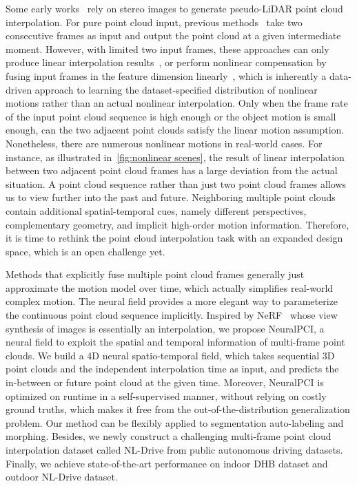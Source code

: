 \documentclass[10pt,twocolumn,letterpaper]{article}
\begin{document}
Some early works~\cite{liu2020plin, liu2021pseudo} rely on stereo images to generate pseudo-LiDAR point cloud interpolation. For pure point cloud input, previous methods~\cite{lu2021pointinet, zeng2022idea} take two consecutive frames as input and output the point cloud at a given intermediate moment. However, with limited two input frames, these approaches can only produce linear interpolation results~\cite{lu2021pointinet}, or perform nonlinear compensation by fusing input frames in the feature dimension linearly~\cite{zeng2022idea}, which is inherently a data-driven approach to learning the dataset-specified distribution of nonlinear motions rather than an actual nonlinear interpolation. Only when the frame rate of the input point cloud sequence is high enough or the object motion is small enough, can the two adjacent point clouds satisfy the linear motion assumption. Nonetheless, there are numerous nonlinear motions in real-world cases. For instance, as illustrated in~\cref{fig:nonlinear scenes}, the result of linear interpolation between two adjacent point cloud frames has a large deviation from the actual situation. A point cloud sequence rather than just two point cloud frames allows us to view further into the past and future. Neighboring multiple point clouds contain additional spatial-temporal cues, namely different perspectives, complementary geometry, and implicit high-order motion information. Therefore, it is time to rethink the point cloud interpolation task with an expanded design space, which is an open challenge yet.
 


Methods that explicitly fuse multiple point cloud frames generally just approximate the motion model over time, which actually simplifies real-world complex motion. The neural field provides a more elegant way to parameterize the continuous point cloud sequence implicitly. Inspired by NeRF~\cite{mildenhall2021nerf} whose view synthesis of images is essentially an interpolation, we propose NeuralPCI, a neural field to exploit the spatial and temporal information of multi-frame point clouds. We build a 4D neural spatio-temporal field, which takes sequential 3D point clouds and the independent interpolation time as input, and predicts the in-between or future point cloud at the given time. Moreover, NeuralPCI is optimized on runtime in a self-supervised manner, without relying on costly ground truths, which makes it free from the out-of-the-distribution generalization problem. Our method can be flexibly applied to segmentation auto-labeling and morphing. Besides, we newly construct a challenging multi-frame point cloud interpolation dataset called NL-Drive from public autonomous driving datasets. Finally, we achieve state-of-the-art performance on indoor DHB dataset and outdoor NL-Drive dataset.
\end{document}
